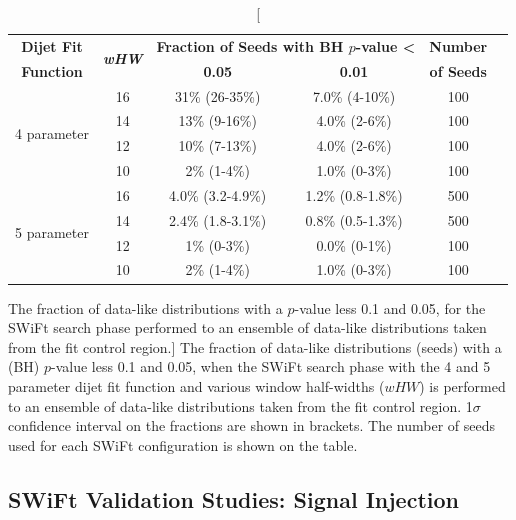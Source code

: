 \begin{table}[!htb]
\centering
\begin{tabular}{|c|c||c|c|c|c|}
  \hline
   \textbf{Dijet Fit}  & \multirow{2}{*}{\textbf{\textit{wHW}}} &\multicolumn{2}{c|}{\textbf{Fraction of Seeds with BH \mbox{$p$-value} \textless}} &   \textbf{Number}   \\ \cline{3-4} 
   \textbf{Function}   &                        & \textbf{0.05}                & \textbf{0.01}                                               &  \textbf{of Seeds}  \\ 
  \hline
  \multirow{4}{*}{4 parameter} &   16 &  31\%   (26-35\%)   &  7.0\% (4-10\%)  & 100  \\
   &   14 &  13\%   (9-16\%)    &  4.0\% (2-6\%)   & 100  \\
   &   12 &  10\%   (7-13\%)    &  4.0\% (2-6\%)   & 100  \\
   &   10 &  2\%   (1-4\%)      &  1.0\% (0-3\%)   & 100  \\
  \hline
  \multirow{4}{*}{5 parameter} &   16 &  4.0\% (3.2-4.9\%)  &  1.2\% (0.8-1.8\%) & 500  \\
  &   14 &  2.4\% (1.8-3.1\%)  &  0.8\% (0.5-1.3\%) & 500  \\
  &   12 &  1\%   (0-3\%)      &  0.0\%  (0-1\%)  & 100  \\
  &   10 &  2\%   (1-4\%)      &  1.0\%  (0-3\%)  & 100  \\
  \hline
\end{tabular}
\caption
    [ The fraction of data-like distributions
      with a \bh{} \mbox{$p$-value} less 0.1 and 0.05,
      for the SWiFt search phase performed to an ensemble of data-like distributions
      taken from the \lm{} fit control region.]
    {\label{tab:bumpH_lm_spuriousSignal}
      The fraction of data-like distributions (seeds) 
      with a \bh{} (BH) \mbox{$p$-value} less 0.1 and 0.05,
      when the SWiFt search phase with the 4 and 5 parameter dijet fit function
      and various window half-widths ($wHW$) is performed to an ensemble of data-like distributions
      taken from the \lm{} fit control region.
      1$\sigma$ confidence interval on the fractions are shown in brackets.
      The number of seeds used for each SWiFt configuration is shown on the table.}
    \vspace{-0.5em}
\end{table}
\newpage

\subsection{SWiFt Validation Studies: Signal Injection}
\label{sec:bkg-full_signalInj}

